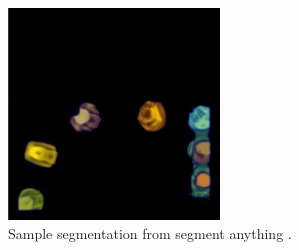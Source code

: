 \begin{figure}
\centering
\includegraphics[width=0.5\textwidth]{img/sample-segment-anything}
\caption{Sample segmentation from segment anything \citep{kirillov2023segment}.}
\label{fig:sample-segment-anything}
\end{figure}

